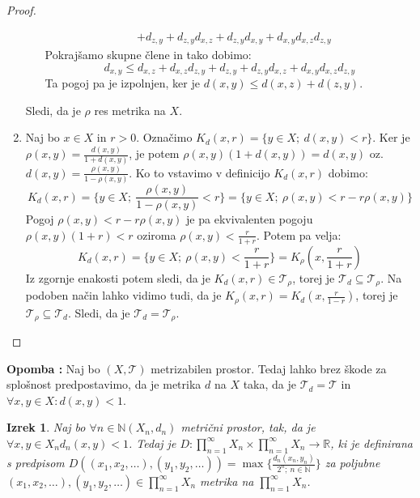 \documentclass[a4paper, 10pt]{article}
\newtheorem{izr}{Izrek}
\newcounter{opombe}
\newenvironment{opomba}{\begin{flushleft}\stepcounter{opombe}\textbf{Opomba \arabic{opombe}:}}{\hfill\end{flushleft}}
\newcommand{\mth}[1]{\ensuremath{\mathbb{#1}}}
\newcommand{\R}{\mth{R}}
\newcommand{\N}{\mth{N}}
\newcommand{\map}[3]{\ensuremath{{#1}: {#2} \rightarrow {#3}}}
\begin{document}
\begin{proof}
\begin{enumerate}
\begin{enumerate}[i)]
\begin{align*}
					&+ d_{z, y} + d_{z, y}d_{x, z} + d_{z, y}d_{x, y} + d_{x, y}d_{x, z}d_{z, y}
				\end{align*}
				Pokrajšamo skupne člene in tako dobimo:
				\begin{equation*}
					d_{x, y} \leq d_{x, z} + d_{x, z}d_{z, y} + d_{z, y} + d_{z, y}d_{x, z} + d_{x, y}d_{x, z}d_{z, y}
				\end{equation*}
				Ta pogoj pa je izpolnjen, ker je $d(x, y)\leq d(x, z) + d(z, y)$.
			\end{enumerate}
			Sledi, da je $\rho$ res metrika na $X$.
			\item Naj bo $x\in X$ in $r>0$. Označimo $K_d(x, r) = \{y\in X;~ d(x, y) < r\}$. Ker je $\rho(x, y) = \frac{d(x, y)}{1 + d(x, y)}$, je potem $\rho(x, y)(1 + d(x, y)) = d(x, y)$ oz. $d(x, y) = \frac{\rho(x, y)}{1 - \rho(x, y)}$. Ko to vstavimo v definicijo $K_d(x, r)$ dobimo: $$K_d(x, r) = \{y\in X;~\frac{\rho(x, y)}{1 - \rho(x, y)}< r\} = \{y\in X;~\rho(x, y)< r - r\rho(x, y)\}$$ Pogoj $\rho(x, y) < r - r\rho(x, y)$ je pa ekvivalenten pogoju $\rho(x, y)(1 + r) < r$ oziroma $\rho(x, y) < \frac{r}{1 + r}$. Potem pa velja: $$K_d(x, r) =\{y\in X;~ \rho(x, y) < \frac{r}{1 + r}\} = K_\rho(x, \frac{r}{1 + r})$$
			Iz zgornje enakosti potem sledi, da je $K_d(x, r) \in \mathcal{T}_\rho$, torej je $\mathcal{T}_d \subseteq \mathcal{T}_\rho$. Na podoben način lahko vidimo tudi, da je $K_\rho(x, r) = K_d(x, \frac{r}{1 - r})$, torej je $\mathcal{T}_\rho \subseteq \mathcal{T}_d$. Sledi, da je $\mathcal{T}_d = \mathcal{T}_\rho$.
		\end{enumerate}
	\end{proof}
	\begin{opomba}
		Naj bo $(X, \mathcal{T})$ metrizabilen prostor. Tedaj lahko brez škode za splošnost predpostavimo, da je metrika $d$ na $X$ taka, da je $\mathcal{T}_d = \mathcal{T}$ in $\forall x, y\in X: d(x, y) < 1$.
	\end{opomba}
	\begin{izr}
		\label{izr:prodmetr}
		Naj bo $\forall n\in\N (X_n, d_n)$ metrični prostor, tak, da je $\forall x, y \in X_n d_n(x, y) < 1$. Tedaj je $\map{D}{\prod_{n = 1}^{\infty}X_n\times\prod_{n = 1}^{\infty}X_n}{\R}$, ki je definirana s predpisom $D((x_1, x_2, \ldots), (y_1, y_2, \ldots)) = \max\{\frac{d_n(x_n, y_n)}{2^n;~n\in\N}\}$ za poljubne $(x_1, x_2, \ldots),(y_1, y_2, \ldots)\in \prod_{n = 1}^{\infty}X_n$ metrika na $\prod_{n = 1}^{\infty}X_n$.
	\end{izr}
\end{document}
